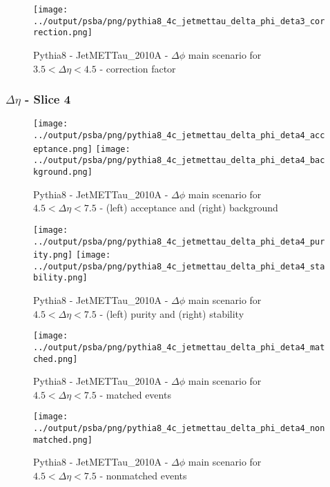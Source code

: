 \documentclass[11pt]{book}
\begin{document}
\begin{figure}[ht]
\centering
\texttt{[image: ../output/psba/png/pythia8\_4c\_jetmettau\_delta\_phi\_deta3\_correction.png]}
\caption{Pythia8 - JetMETTau\_2010A - $\Delta\phi$ main scenario for $3.5 < \Delta\eta < 4.5$ - correction factor}
\label{fig:p8_jetmettau_delta_phi_deta3_correction}
\end{figure}

\clearpage
\subsubsection{$\Delta\eta$ - Slice 4}

\begin{figure}[ht]
\centering
\texttt{[image: ../output/psba/png/pythia8\_4c\_jetmettau\_delta\_phi\_deta4\_acceptance.png]}
\texttt{[image: ../output/psba/png/pythia8\_4c\_jetmettau\_delta\_phi\_deta4\_background.png]}
\caption{Pythia8 - JetMETTau\_2010A - $\Delta\phi$ main scenario for $4.5 < \Delta\eta < 7.5$ - (left) acceptance and (right) background}
\label{fig:p8_jetmettau_delta_phi_deta4_ab}
\end{figure}

\begin{figure}[ht]
\centering
\texttt{[image: ../output/psba/png/pythia8\_4c\_jetmettau\_delta\_phi\_deta4\_purity.png]}
\texttt{[image: ../output/psba/png/pythia8\_4c\_jetmettau\_delta\_phi\_deta4\_stability.png]}
\caption{Pythia8 - JetMETTau\_2010A - $\Delta\phi$ main scenario for $4.5 < \Delta\eta < 7.5$ - (left) purity and (right) stability}
\label{fig:p8_jetmettau_delta_phi_deta4_ps}
\end{figure}

\begin{figure}[ht]
\centering
\texttt{[image: ../output/psba/png/pythia8\_4c\_jetmettau\_delta\_phi\_deta4\_matched.png]}
\caption{Pythia8 - JetMETTau\_2010A - $\Delta\phi$ main scenario for $4.5 < \Delta\eta < 7.5$ - matched events}
\label{fig:p8_jetmettau_delta_phi_deta4_matched}
\end{figure}

\begin{figure}[ht]
\centering
\texttt{[image: ../output/psba/png/pythia8\_4c\_jetmettau\_delta\_phi\_deta4\_nonmatched.png]}
\caption{Pythia8 - JetMETTau\_2010A - $\Delta\phi$ main scenario for $4.5 < \Delta\eta < 7.5$ - nonmatched events}
\label{fig:p8_jetmettau_delta_phi_deta4_nonmatched}
\end{figure}
\end{document}
